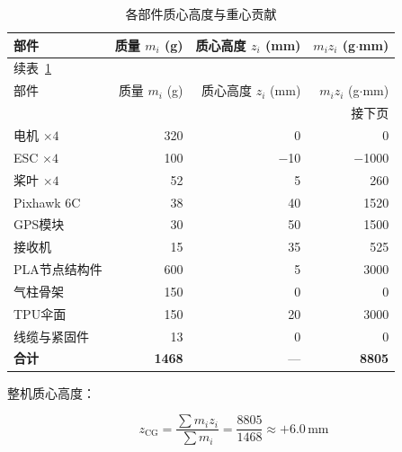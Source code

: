\begin{longtable}{lrrr}
    \caption{各部件质心高度与重心贡献}
    \label{tab:cg_analysis} \\

    \toprule
    部件 & 质量 $m_i$ (g) & 质心高度 $z_i$ (mm) & $m_i z_i$ (g$\cdot$mm) \\
    \midrule
    \endfirsthead

    \multicolumn{4}{l}{\small 续表~\ref*{tab:cg_analysis}} \\[2pt]
    \toprule
    部件 & 质量 $m_i$ (g) & 质心高度 $z_i$ (mm) & $m_i z_i$ (g$\cdot$mm) \\
    \midrule
    \endhead

    \midrule
    \multicolumn{4}{r}{\small 接下页} \\
    \endfoot

    \bottomrule
    \endlastfoot

    电机 $\times 4$   & 320  &  0    &     0 \\[3pt]
    ESC $\times 4$    & 100  & $-$10 & $-$1000 \\[3pt]
    桨叶 $\times 4$   &  52  &  5    &   260 \\[3pt]
    Pixhawk 6C        &  38  &  40   &  1520 \\[3pt]
    GPS模块           &  30  &  50   &  1500 \\[3pt]
    接收机            &  15  &  35   &   525 \\[3pt]
    PLA节点结构件     & 600  &  5    &  3000 \\[3pt]
    气柱骨架          & 150  &  0    &     0 \\[3pt]
    TPU伞面          & 150  &  20   &  3000 \\[3pt]
    线缆与紧固件      &  13  &  0    &     0 \\
    \midrule
    \textbf{合计}     & \textbf{1468} & — & \textbf{8805} \\

\end{longtable}

整机质心高度：

\begin{equation}
    z_{\text{CG}} = \frac{\sum m_i z_i}{\sum m_i} = \frac{8805}{1468} \approx +6.0\,\text{mm}
    \label{eq:cg_height}
\end{equation}

